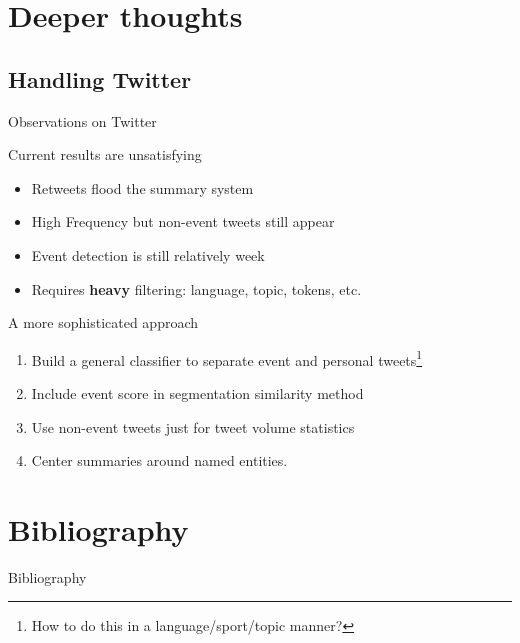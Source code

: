 \documentclass[compress]{beamer}
\begin{document}
\section{Deeper thoughts}

\subsection{Handling Twitter}

\begin{frame}{Observations on Twitter}

\begin{block}{Current results are unsatisfying}
\begin{itemize}
\item Retweets flood the summary system
\item High Frequency but non-event tweets still appear
\item Event detection is still relatively week
\item Requires \textbf{heavy} filtering: language, topic, tokens, etc.
\end{itemize}
\end{block}

\pause

\begin{block}{A more sophisticated approach}
\begin{enumerate}
\item Build a general classifier to separate event and personal tweets\footnote{
How to do this in a language/sport/topic manner?}
\item Include event score in segmentation similarity method
\item Use non-event tweets just for tweet volume statistics
\item Center summaries around named entities.
\end{enumerate}
\end{block}
\end{frame}

\section{Bibliography}

\begin{frame}{Bibliography}
\tiny


\end{frame}
\end{document}
